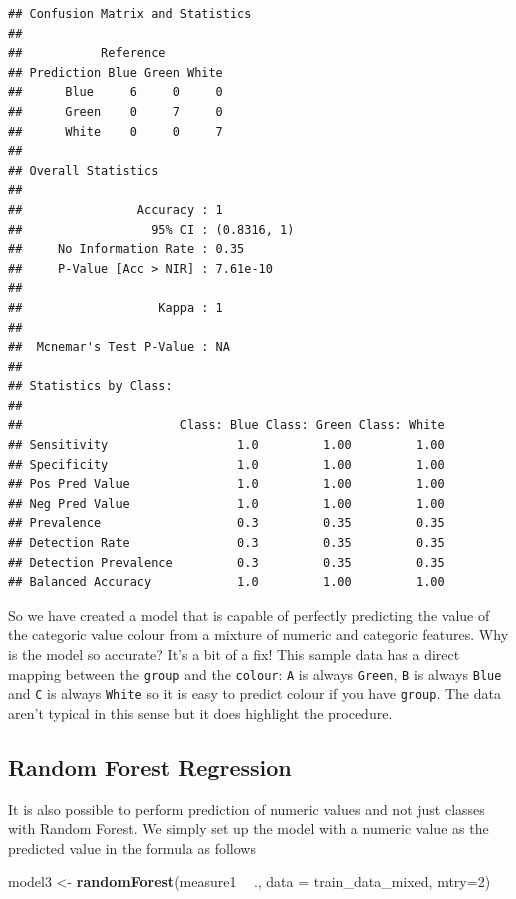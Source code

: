 \documentclass[
]{book}
\newenvironment{Shaded}{\begin{snugshade}}{\end{snugshade}}
\newcommand{\DataTypeTok}[1]{\textcolor[rgb]{0.13,0.29,0.53}{#1}}
\newcommand{\DecValTok}[1]{\textcolor[rgb]{0.00,0.00,0.81}{#1}}
\newcommand{\KeywordTok}[1]{\textcolor[rgb]{0.13,0.29,0.53}{\textbf{#1}}}
\newcommand{\NormalTok}[1]{#1}
\newcommand{\OperatorTok}[1]{\textcolor[rgb]{0.81,0.36,0.00}{\textbf{#1}}}
\newcommand{\StringTok}[1]{\textcolor[rgb]{0.31,0.60,0.02}{#1}}
\begin{document}
\begin{verbatim}
## Confusion Matrix and Statistics
## 
##           Reference
## Prediction Blue Green White
##      Blue     6     0     0
##      Green    0     7     0
##      White    0     0     7
## 
## Overall Statistics
##                                      
##                Accuracy : 1          
##                  95% CI : (0.8316, 1)
##     No Information Rate : 0.35       
##     P-Value [Acc > NIR] : 7.61e-10   
##                                      
##                   Kappa : 1          
##                                      
##  Mcnemar's Test P-Value : NA         
## 
## Statistics by Class:
## 
##                      Class: Blue Class: Green Class: White
## Sensitivity                  1.0         1.00         1.00
## Specificity                  1.0         1.00         1.00
## Pos Pred Value               1.0         1.00         1.00
## Neg Pred Value               1.0         1.00         1.00
## Prevalence                   0.3         0.35         0.35
## Detection Rate               0.3         0.35         0.35
## Detection Prevalence         0.3         0.35         0.35
## Balanced Accuracy            1.0         1.00         1.00
\end{verbatim}

So we have created a model that is capable of perfectly predicting the value of the categoric value colour from a mixture of numeric and categoric features. Why is the model so accurate? It's a bit of a fix! This sample data has a direct mapping between the \texttt{group} and the \texttt{colour}: \texttt{A} is always \texttt{Green}, \texttt{B} is always \texttt{Blue} and \texttt{C} is always \texttt{White} so it is easy to predict colour if you have \texttt{group}. The data aren't typical in this sense but it does highlight the procedure.

\hypertarget{random-forest-regression}{%
\subsection{Random Forest Regression}\label{random-forest-regression}}

It is also possible to perform prediction of numeric values and not just classes with Random Forest. We simply set up the model with a numeric value as the predicted value in the formula as follows

\begin{Shaded}
\begin{Highlighting}[]
\NormalTok{model3 <-}\StringTok{ }\KeywordTok{randomForest}\NormalTok{(measure1 }\OperatorTok{~}\StringTok{ }\NormalTok{., }\DataTypeTok{data =}\NormalTok{ train_data_mixed, }\DataTypeTok{mtry=}\DecValTok{2}\NormalTok{)}
\end{Highlighting}
\end{Shaded}
\end{document}
